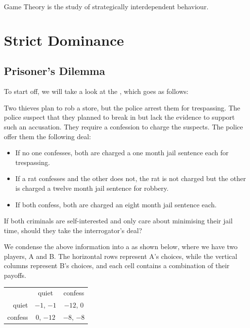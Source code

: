 Game Theory is the study of strategically interdependent behaviour.
\section{Strict Dominance}
\subsection{Prisoner's Dilemma}
To start off, we will take a look at the , which goes as follows:

\begin{ebox}
Two thieves plan to rob a store, but the police arrest them for trespassing. The police suspect that they planned to break in but lack the evidence to support such an accusation. They require a confession to charge the suspects. The police offer them the following deal:
\begin{itemize}
\item If no one confesses, both are charged a one month jail sentence each for trespassing.
\item If a rat confesses and the other does not, the rat is not charged but the other is charged a twelve month jail sentence for robbery.
\item If both confess, both are charged an eight month jail sentence each.
\end{itemize}
If both criminals are self-interested and only care about minimising their jail time, should they take the interrogator's deal?
\end{ebox}

We condense the above information into a  as shown below, where we have two players, A and B. The horizontal rows represent A's choices, while the vertical columns represent B's choices, and each cell contains a combination of their payoffs.

\begin{table}[H]
\centering
\begin{tabular}{rcc}
\multicolumn{1}{l}{}         & quiet                       & confess                     \\ \cline{2-3} 
\multicolumn{1}{r|}{quiet}   & \multicolumn{1}{c|}{$-1$, $-1$} & \multicolumn{1}{c|}{$-12$, $0$} \\ \cline{2-3} 
\multicolumn{1}{r|}{confess} & \multicolumn{1}{c|}{$0$, $-12$} & \multicolumn{1}{c|}{$-8$, $-8$} \\ \cline{2-3} 
\end{tabular}
\end{table}

